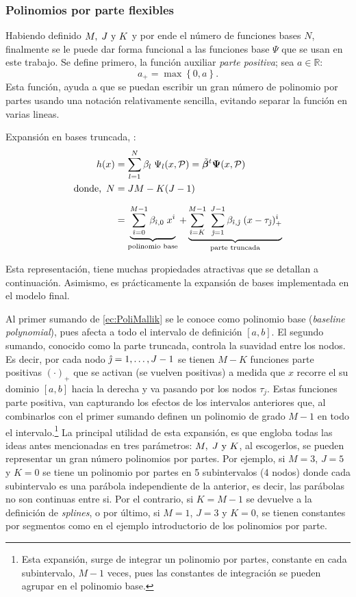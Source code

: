 \documentclass[../Main/Main.tex]{subfiles}
\begin{document}
\subsubsection*{Polinomios por parte flexibles} 
Habiendo definido $M,\;J\text{ y }K$ y por ende el número de funciones bases $N$, finalmente se le puede dar forma funcional a las funciones base $\Psi$ que se usan en este trabajo. Se define primero, la función auxiliar \textit{parte positiva}; sea $a \in \mathbb{R}$:
$$  a_+ = \max\left\{0,a\right\}.$$
Esta función, ayuda a que se puedan escribir un gran número de polinomio por partes usando una notación relativamente sencilla, evitando separar la función en varias lineas. 

\begin{definition} Expansión en bases truncada, \citet{mallik1998automatic}:
\begin{align}
	h(x) &= \sum_{l = 1}^{N} \beta_l \; \Psi_l(x,\mathcal{P}) = \tilde{\bm{\beta}}^t\bm{\Psi}(x,\mathcal{P})\label{ec:ExpBase_NEstrella} \\ 
	\text{donde, } \, N &= JM - K(J-1) \nonumber \\[7pt]
 		 &=	\underbrace{
	        \sum_{\hat{\imath} = 0}^{M - 1} \beta_{\hat{\imath},0} \; x^{\hat{\imath}}
 		    }_\text{polinomio base} + 
			\underbrace{
			\sum_{\hat{\imath} = K}^{M-1} \;
	 		\sum_{\hat{\jmath} = 1}^{J-1}\beta_{\hat{\imath},\hat{\jmath}}\;(x - \tau_{\hat{\jmath}})_+^{\hat{\imath}}
	 		}_\text{parte truncada}
	 			\label{ec:PoliMallik}
\end{align}
\end{definition}
Esta representación, tiene muchas propiedades atractivas que se detallan a continuación. Asimismo, es prácticamente la expansión de bases implementada en el modelo final.

Al primer sumando de \eqref{ec:PoliMallik} se le conoce como polinomio base (\textit{baseline polynomial}), pues afecta a todo el intervalo de definición $[a,b]$. El segundo sumando, conocido como la parte truncada, controla la suavidad entre los nodos. Es decir, por cada nodo $\hat{\jmath} = 1,\ldots,J-1$ se tienen $M - K$ funciones parte positivas $(\cdot)_{+}$ que se activan (se vuelven positivas) a medida que $x$ recorre el su dominio $[a,b]$ hacia la derecha y va pasando por los nodos $\tau_j$. Estas funciones parte positiva, van capturando los efectos de los intervalos anteriores que, al combinarlos con el primer sumando definen un polinomio de grado $M - 1$ en todo el intervalo.\footnote{Esta expansión, surge de integrar un polinomio por partes, constante en cada subintervalo, $M-1$ veces, pues las constantes de integración se pueden agrupar en el polinomio base.} La principal utilidad de esta expansión, es que engloba todas las ideas antes mencionadas en tres parámetros: $M,\;J\text{ y }K$, al escogerlos, se pueden representar un gran número polinomios por partes. Por ejemplo, si $M = 3$, $J = 5$ y $K = 0$ se tiene un polinomio por partes en 5 subintervalos (4 nodos) donde cada subintervalo es una parábola independiente de la anterior, es decir, las parábolas no son continuas entre si. Por el contrario, si $K = M - 1$ se devuelve a la definición de \textit{splines}, o por último, si $M = 1$, $J = 3$ y $K = 0$, se tienen constantes por segmentos como en el ejemplo introductorio de los polinomios por parte.
\end{document}
